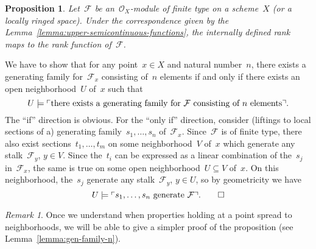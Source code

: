 \documentclass[10pt,reqno,a4paper]{amsbook}
\makeatletter
\theoremstyle{definition}
\theoremstyle{plain}
\newtheorem{prop}[defn]{Proposition}
\theoremstyle{remark}
\newtheorem{rem}[defn]{Remark}
\newcommand{\F}{\mathcal{F}}
\renewcommand{\O}{\mathcal{O}}
\newcommand{\?}{\,{:}\,}
\renewcommand{\_}{\mathpunct{.}\,}
\newcommand{\speak}[1]{\ulcorner\text{\textnormal{#1}}\urcorner}
\renewenvironment{proof}[1][\proofname]{\par
  \pushQED{\qed}%
  \normalfont \topsep6\p@\@plus6\p@\relax
  \trivlist
  \item[\hskip\labelsep
        \itshape
    #1\@addpunct{.}]\ignorespaces
}{%
  \popQED\endtrivlist\@endpefalse
}
\makeatother
\begin{document}
\begin{prop}\label{prop:rank-function-internally}
Let~$\F$ be an~$\O_X$-module of finite type on a scheme~$X$ (or a locally ringed
space). Under the correspondence given by the Lemma~\ref{lemma:upper-semicontinuous-functions}, the internally
defined rank maps to the rank function of~$\F$.
\end{prop}
\begin{proof}
We have to show that for any point~$x \in X$ and natural number~$n$, there
exists a generating family for~$\F_x$ consisting of~$n$
elements if and only if there exists an open neighborhood~$U$ of~$x$ such that
\[ U \models \speak{there exists a generating family
for~$\F$ consisting of~$n$ elements}. \]
The ``if'' direction is obvious. For the ``only if'' direction, consider
(liftings to local sections of a)
generating family~$s_1,\ldots,s_n$ of~$\F_x$. Since~$\F$ is of finite type,
there also exist sections~$t_1,\ldots,t_m$ on some neighborhood~$V$ of~$x$ which
generate any stalk~$\F_y$, $y \in V$. Since the~$t_i$ can be expressed as a
linear combination of the~$s_j$ in~$\F_x$, the same is true on some open
neighborhood~$U \subseteq V$ of~$x$. On this neighborhood, the~$s_j$ generate
any stalk~$\F_y$, $y \in U$, so by geometricity we have
\[ U \models \speak{$s_1,\ldots,s_n$ generate~$\F$}. \qedhere \]
\end{proof}
\begin{rem}Once we understand when properties holding at a point spread to
neighborhoods, we will be able to give a simpler proof of the proposition (see
Lemma~\ref{lemma:gen-family-n}).\end{rem}
\end{document}
